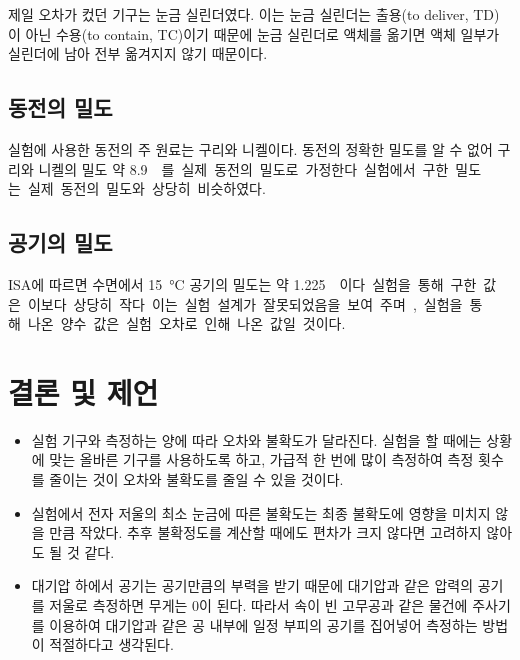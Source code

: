 \documentclass{GSHS-chemexp}
\begin{document}
	제일 오차가 컸던 기구는 눈금 실린더였다. 이는 눈금 실린더는
	출용(to deliver, TD)이 아닌 수용(to contain, TC)이기 때문에
	눈금 실린더로 액체를 옮기면 액체 일부가 실린더에 남아 전부 옮겨지지
	않기 때문이다.
	
	\subsection{동전의 밀도}
	실험에 사용한 동전의 주 원료는 구리와 니켈이다.
	동전의 정확한 밀도를 알 수 없어 구리와 니켈의 밀도
	약 \SI{8.9}{\gram\per\centi\metre\cubic}를 실제 동전의 밀도로 가정한다.
	
	실험에서 구한 밀도는 실제 동전의 밀도와 상당히 비슷하였다.
	
	\subsection{공기의 밀도}
	ISA에 따르면 수면에서 \SI{15}{\degreeCelsius} 공기의 밀도는
	약 \SI{1.225}{\milli\gram\per\centi\metre\cubic}이다.
	실험을 통해 구한 값은 이보다 상당히 작다.
	이는 실험 설계가 잘못되었음을 보여 주며,
	실험을 통해 나온 양수 값은 실험 오차로 인해 나온 값일 것이다.
	
	\section{결론 및 제언}
	\begin{itemize}
		\item 실험 기구와 측정하는 양에 따라 오차와 불확도가 달라진다.
		실험을 할 때에는 상황에 맞는 올바른 기구를 사용하도록 하고,
		가급적 한 번에 많이 측정하여 측정 횟수를 줄이는 것이
		오차와 불확도를 줄일 수 있을 것이다.
		\item 실험에서 전자 저울의 최소 눈금에 따른 불확도는 최종 불확도에
		영향을 미치지 않을 만큼 작았다. 추후 불확정도를 계산할 때에도
		편차가 크지 않다면 고려하지 않아도 될 것 같다.
		\item 대기압 하에서 공기는 공기만큼의 부력을 받기 때문에
		대기압과 같은 압력의 공기를 저울로 측정하면 무게는 0이 된다.
		따라서 속이 빈 고무공과 같은 물건에 주사기를 이용하여 대기압과 같은
		공 내부에 일정 부피의 공기를 집어넣어 측정하는 방법이
		적절하다고 생각된다. \cite{kimandjang}
	\end{itemize}
	
\end{document}
